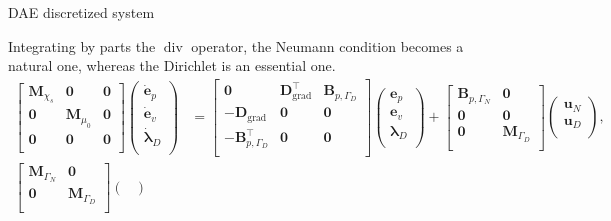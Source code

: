 \documentclass[aspectratio=169]{ISAE-Beamer}
\DeclareMathOperator*{\grad}{grad}
\renewcommand{\div}{\operatorname{div}}
\begin{document}
\begin{frame}{DAE discretized system}

Integrating by parts the $\div$ operator, the Neumann condition becomes a natural one, whereas the Dirichlet is an essential one.
\begin{equation*}
\begin{aligned}
\begin{bmatrix}
\mathbf{M}_{\chi_s} & \mathbf{0} & \mathbf{0}\\
\mathbf{0} & \mathbf{M}_{\mu_0} & \mathbf{0} \\
\mathbf{0} & \mathbf{0} & \mathbf{0} \\
\end{bmatrix}
\begin{pmatrix}
\dot{\mathbf{e}}_p\\
\dot{\mathbf{e}}_v\\
\dot{\bm{\lambda}}_D \\
\end{pmatrix}
&= \begin{bmatrix}
\mathbf{0} & \mathbf{D}_{\grad}^\top & \mathbf{B}_{p, \Gamma_D}\\
-\mathbf{D}_{\grad} & \mathbf{0} & \mathbf{0} \\
-\mathbf{B}_{p, \Gamma_D}^\top & \mathbf{0} & \mathbf{0} \\
\end{bmatrix}
\begin{pmatrix}
{\mathbf{e}}_p\\
{\mathbf{e}}_v\\
{\bm{\lambda}}_D \\
\end{pmatrix} + \begin{bmatrix}
\mathbf{B}_{p, \Gamma_N} & \mathbf{0}\\
\mathbf{0}& \mathbf{0}\\
\mathbf{0} & \mathbf{M}_{\Gamma_D} \\
\end{bmatrix}
\begin{pmatrix}
\mathbf{u}_N \\
\mathbf{u}_D \\
\end{pmatrix}, \\
\begin{bmatrix}
\mathbf{M}_{\Gamma_N} & \mathbf{0} \\
\mathbf{0} & \mathbf{M}_{\Gamma_D} \\
\end{bmatrix}
\begin{pmatrix}

\end{pmatrix}
\end{aligned}
\end{equation*}
\end{frame}
\end{document}
